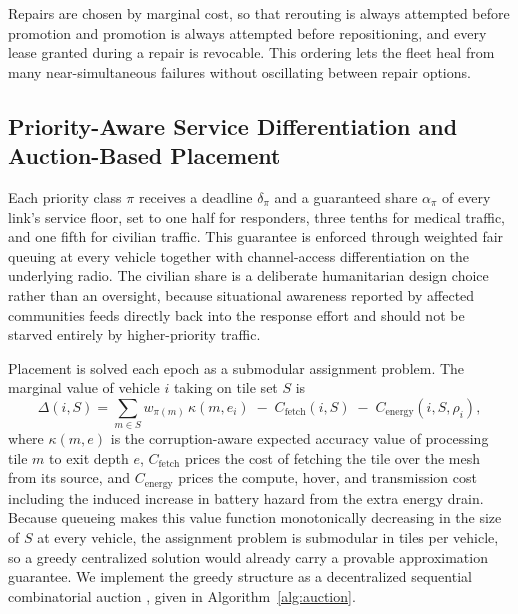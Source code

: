 \documentclass[drones,article,submit,moreauthors]{Definitions/mdpi}
\begin{document}
Repairs are chosen by marginal cost, so that rerouting is always attempted before promotion and promotion is always attempted before repositioning, and every lease granted during a repair is revocable. This ordering lets the fleet heal from many near-simultaneous failures without oscillating between repair options.

\subsection{Priority-Aware Service Differentiation and Auction-Based Placement}

Each priority class $\pi$ receives a deadline $\delta_\pi$ and a guaranteed share $\alpha_\pi$ of every link's service floor, set to one half for responders, three tenths for medical traffic, and one fifth for civilian traffic. This guarantee is enforced through weighted fair queuing at every vehicle together with channel-access differentiation on the underlying radio. The civilian share is a deliberate humanitarian design choice rather than an oversight, because situational awareness reported by affected communities feeds directly back into the response effort and should not be starved entirely by higher-priority traffic.

Placement is solved each epoch as a submodular assignment problem. The marginal value of vehicle $i$ taking on tile set $S$ is
\begin{equation}
\Delta(i, S) = \sum_{m \in S} w_{\pi(m)}\, \kappa(m, e_i) \;-\; C_{\mathrm{fetch}}(i, S) \;-\; C_{\mathrm{energy}}(i, S, \rho_i),
\end{equation}
where $\kappa(m, e)$ is the corruption-aware expected accuracy value of processing tile $m$ to exit depth $e$, $C_{\mathrm{fetch}}$ prices the cost of fetching the tile over the mesh from its source, and $C_{\mathrm{energy}}$ prices the compute, hover, and transmission cost including the induced increase in battery hazard from the extra energy drain. Because queueing makes this value function monotonically decreasing in the size of $S$ at every vehicle, the assignment problem is submodular in tiles per vehicle, so a greedy centralized solution would already carry a provable approximation guarantee. We implement the greedy structure as a decentralized sequential combinatorial auction \cite{bertsekas1988auction,dimakis2010gossip}, given in Algorithm~\ref{alg:auction}.
\end{document}

